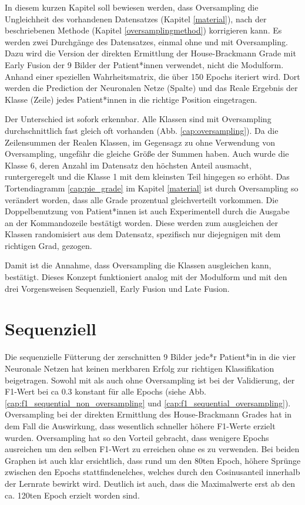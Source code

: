 In diesem kurzen Kapitel soll bewiesen werden, dass Oversampling die Ungleichheit des vorhandenen Datensatzes (Kapitel \ref{material}), nach der beschriebenen Methode (Kapitel \ref{oversamplingmethod}) korrigieren kann. Es werden zwei Durchgänge des Datensatzes, einmal ohne und mit Oversampling. Dazu wird die Version der direkten Ermittlung der House-Brackmann Grade mit Early Fusion der 9 Bilder der Patient*innen verwendet, nicht die Modulform. Anhand einer speziellen Wahrheitsmatrix, die über 150 Epochs iteriert wird. Dort werden die Prediction der Neuronalen Netze (Spalte) und das Reale Ergebnis der Klasse (Zeile) jedes Patient*innen in die richtige Position eingetragen.
\vspace{0.3cm}

Der Unterschied ist sofork erkennbar. Alle Klassen sind mit Oversampling durchschnittlich fast gleich oft vorhanden (Abb. \ref{cap:oversampling}). Da die Zeilensummen der Realen Klassen, im Gegensagz zu ohne Verwendung von Oversampling, ungefähr die gleiche Größe der Summen haben. Auch wurde die Klasse 6, deren Anzahl im Datensatz den höchsten Anteil ausmacht, runtergeregelt und die Klasse 1 mit dem kleinsten Teil hingegen so erhöht. Das Tortendiagramm \ref{cap:pie_grade} im Kapitel \ref{material}  ist durch Oversampling so verändert worden, dass alle Grade prozentual gleichverteilt vorkommen. Die Doppelbenutzung von Patient*innen ist auch Experimentell durch die Ausgabe an der Kommandozeile bestätigt worden. Diese werden zum ausgleichen der Klassen randomisiert aus dem Datensatz, spezifisch nur diejegnigen mit dem richtigen Grad, gezogen.

\vspace{0.3cm}

Damit ist die Annahme, dass Oversampling die Klassen ausgleichen kann, bestätigt. Dieses Konzept funktioniert analog mit der Modulform und mit den drei Vorgensweisen Sequenziell, Early Fusion und Late Fusion.




\clearpage
\section{Sequenziell}\label{sequent}
Die sequenzielle Fütterung der zerschnitten 9 Bilder jede*r Patient*in in die vier Neuronale Netzen hat keinen merkbaren Erfolg zur richtigen Klassifikation beigetragen. Sowohl mit als auch ohne Oversampling ist bei der Validierung, der F1-Wert bei ca 0.3 konstant für alle Epochs (siehe Abb. \ref{cap:f1_sequential_non_oversampling} und \ref{cap:f1_sequential_oversampling}). Oversampling bei der direkten Ermittlung des House-Brackmann Grades hat in dem Fall die Auswirkung, dass wesentlich schneller höhere F1-Werte erzielt wurden. Oversampling hat so den Vorteil gebracht, dass wenigere Epochs ausreichen um den selben F1-Wert zu erreichen ohne es zu verwenden. Bei beiden Graphen ist auch klar ersichtlich, dass rund um den 80ten Epoch, höhere Sprünge zwischen den Epochs stattfindenelches, welches durch den Cosinusanteil innerhalb der Lernrate bewirkt wird. Deutlich ist auch, dass die Maximalwerte erst ab den ca. 120ten Epoch erzielt worden sind.

